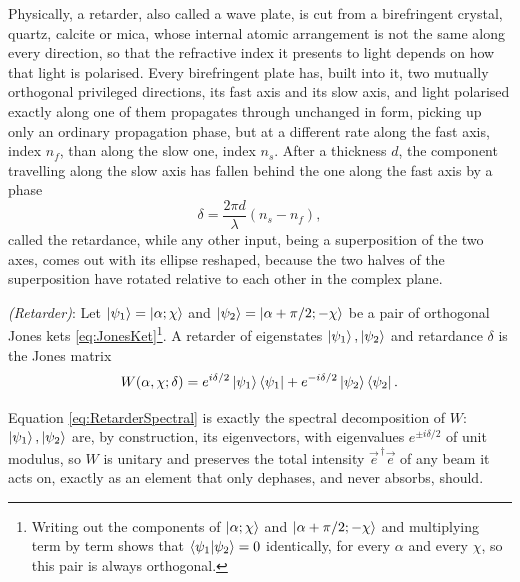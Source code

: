             Physically, a retarder, also called a wave plate, is cut from a birefringent crystal, quartz, calcite or mica, whose internal atomic arrangement is not the same along every direction, so that the refractive index it presents to light depends on how that light is polarised. Every birefringent plate has, built into it, two mutually orthogonal privileged directions, its fast axis and its slow axis, and light polarised exactly along one of them propagates through unchanged in form, picking up only an ordinary propagation phase, but at a different rate along the fast axis, index $n_f$, than along the slow one, index $n_s$. After a thickness $d$, the component travelling along the slow axis has fallen behind the one along the fast axis by a phase
            \begin{equation}\label{eq:Retardance}
                \delta = \frac{2\pi d}{\lambda}\left(n_s-n_f\right),
            \end{equation}
            called the retardance, while any other input, being a superposition of the two axes, comes out with its ellipse reshaped, because the two halves of the superposition have rotated relative to each other in the complex plane.

            \begin{myDef}
                \textit{(Retarder)}: Let $\ket{\psi_1}=\ket{\alpha;\chi}$ and $\ket{\psi_2}=\ket{\alpha+\pi/2;-\chi}$ be a pair of orthogonal Jones kets \ref{eq:JonesKet}\footnote{Writing out the components of $\ket{\alpha;\chi}$ and $\ket{\alpha+\pi/2;-\chi}$ and multiplying term by term shows that $\braket{\psi_1|\psi_2}=0$ identically, for every $\alpha$ and every $\chi$, so this pair is always orthogonal.}. A retarder of eigenstates $\ket{\psi_1},\ket{\psi_2}$ and retardance $\delta$ is the Jones matrix
                \begin{equation}\label{eq:RetarderSpectral}
                    W(\alpha,\chi;\delta) = e^{i\delta/2}\ket{\psi_1}\bra{\psi_1} + e^{-i\delta/2}\ket{\psi_2}\bra{\psi_2}.
                \end{equation}
            \end{myDef}

            Equation \ref{eq:RetarderSpectral} is exactly the spectral decomposition of $W$: $\ket{\psi_1},\ket{\psi_2}$ are, by construction, its eigenvectors, with eigenvalues $e^{\pm i\delta/2}$ of unit modulus, so $W$ is unitary and preserves the total intensity $\vec{e}^{\,\dagger}\vec{e}$ of any beam it acts on, exactly as an element that only dephases, and never absorbs, should.


